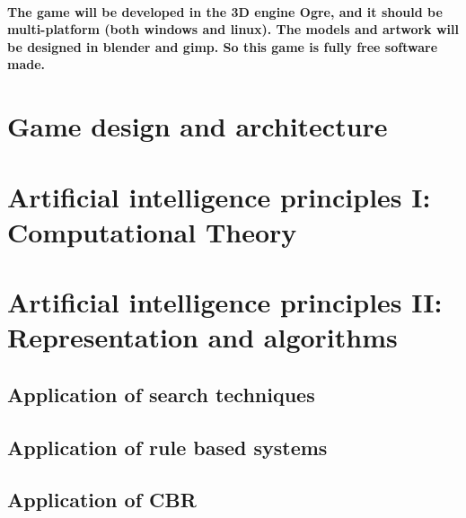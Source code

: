 \documentclass[a4paper,10pt]{article}
\newcommand{\p}[1]{\paragraph{\indent\textnormal{#1}}}
\begin{document}
    \p{The game will be developed in the 3D engine  Ogre, and it should be multi-platform (both windows and linux). The models and artwork will be designed in blender and gimp. So this game is fully free software made.}
    
\newpage
\section{Game design and architecture}


\newpage
\section{Artificial intelligence principles I: Computational Theory}

\newpage
\section{Artificial intelligence principles II: Representation and algorithms}

  \subsection{Application of search techniques}

  \subsection{Application of rule based systems}

  \subsection{Application of CBR}
\end{document}
